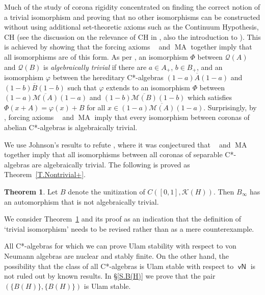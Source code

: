 \documentclass[11pt]{amsproc}
\newcommand{\cstar}{C*}
\DeclareMathOperator{\sfvN}{\mathsf {vN}}
\newcommand{\cM}{\mathcal M}
\newcommand{\cQ}{\mathcal Q}
\newcommand{\cK}{\mathcal K}
\DeclareMathOperator{\OCAT}{OCA_T}
\DeclareMathOperator{\MA}{MA}
\theoremstyle{definition}
\newtheorem{thm}{Theorem}
\theoremstyle{plain}
\theoremstyle{remark}
\begin{document}
Much of the study of corona rigidity concentrated on finding the correct notion of a trivial isomorphism and proving that no other isomorphisms can be constructed without using additional set-theoretic axioms such as the Continuum Hypothesis, CH (see the discussion on the relevance of CH in \cite[\S 6 and, on a very abstract level, \S 12.1]{farah2025corona}, also the introduction to \cite{vignati2022rigidity}). This is achieved by showing that the forcing axioms $\OCAT$ and $\MA$ together imply that all isomorphisms are of this form. 
As per \cite[Definition~1.2]{vignati2022rigidity}, an isomorphism $\Phi$ between $\cQ(A)$ and $\cQ(B)$ is \emph{algebraically trivial} if there are $a\in A_+$, $b\in B_+$, and an isomorphism $\varphi$ between the hereditary \cstar-algebras $\overline{(1-a)A(1-a)}$ and $\overline{(1-b)B(1-b)}$ such that $\varphi$ extends to an isomorphism $\Phi$ between $\overline{(1-a)\cM(A)(1-a)}$ and $\overline{(1-b)\cM(B)(1-b)}$ which satisfies  $\Phi(x+A)=\varphi(x)+B$ for all $x\in 
\overline{(1-a)\cM(A)(1-a)}$. 
Surprisingly, by \cite[Theorem~C]{vignati2022rigidity}, forcing axioms $\OCAT$ and $\MA$ imply that every isomorphism between coronas of abelian \cstar-algebras is algebraically trivial.

We use Johnson's results to refute 
\cite[Conjecture 5.1]{vignati2022rigidity}, where it was conjectured that  $\OCAT$ and $\MA$ together imply that all isomorphisms between all coronas of separable \cstar-algebras are algebraically trivial. The following is proved as Theorem~\ref{T.Nontrivial+}. 

\begin{thm} \label{T.Nontrivial} Let $B$ denote the unitization of $C([0,1],\cK(H))$. Then $B_\infty$ has an automorphism that is not algebraically trivial.
\end{thm}

We consider Theorem~\ref{T.Nontrivial} and its proof as an indication that the definition of `trivial isomorphism' needs to be revised rather than as a mere counterexample. 

All \cstar-algebras for which we can prove Ulam stability with respect to von Neumann algebras are nuclear and stably finite. On the other hand, the possibility that the class of all \cstar-algebras is Ulam stable with respect to $\sfvN$ is not ruled out by known results. 
In \S\ref{S.B(H)} we prove that the pair $(\{B(H)\},\{B(H)\})$ is Ulam stable. 
\end{document}
